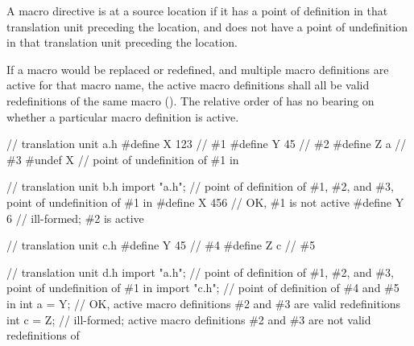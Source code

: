 \begin{std.txt}
\pnum
A macro directive is  at a source location
if it has a point of definition in that translation unit preceding the location,
and does not have a point of undefinition in that translation unit preceding
the location.

\pnum
If a macro would be replaced or redefined, and multiple macro definitions
are active for that macro name, the active macro definitions shall all be
valid redefinitions of the same macro ().
\enternote
The relative order of  has no bearing on whether a
particular macro definition is active.
\exitnote

\pnum
\begin{example}
\begin{codeblock}
// translation unit a.h
#define X 123 // \#1
#define Y 45  // \#2
#define Z a   // \#3
#undef X      // point of undefinition of \#1 in 
\end{codeblock}

\begin{codeblock}
// translation unit b.h
import "a.h"; // point of definition of \#1, \#2, and \#3, point of undefinition of \#1 in 
#define X 456 // OK, \#1 is not active
#define Y 6   // ill-formed; \#2 is active
\end{codeblock}

\begin{codeblock}
// translation unit c.h
#define Y 45  // \#4
#define Z c   // \#5
\end{codeblock}

\begin{codeblock}
// translation unit d.h
import "a.h"; // point of definition of \#1, \#2, and \#3, point of undefinition of \#1 in 
import "c.h"; // point of definition of \#4 and \#5 in 
int a = Y;    // OK, active macro definitions \#2 and \#3 are valid redefinitions
int c = Z;    // ill-formed; active macro definitions \#2 and \#3 are not valid redefinitions of 
\end{codeblock}
\end{example}
\end{std.txt}

